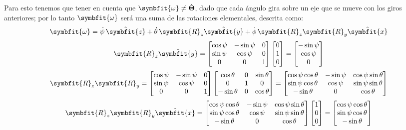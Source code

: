 \documentclass[11pt,a4paper]{article}
\numberwithin{equation}{section}
\newcommand{\vect}[1]{\symbfit{#1}}
\begin{document}
Para esto tenemos que tener en cuenta que $\vect\omega \neq \dot{\boldsymbol\Theta}$, dado que cada ángulo gira sobre un eje que se mueve con los giros anteriores; por lo tanto $\vect\omega$ será una suma de las rotaciones elementales, descrita como:
\[
\vect\omega = \dot\psi\,\hat{\vect z} + \dot\theta\,\vect R_z\hat{\vect y} + \dot\phi\,\vect R_z\vect R_y\hat{\vect x}
\]
\[
\vect R_z\hat{\vect y} = \begin{bmatrix}\cos\psi & -\sin\psi & 0\\ \sin\psi & \cos\psi & 0\\ 0 & 0 & 1\end{bmatrix}\begin{bmatrix}0\\1\\0\end{bmatrix} = \begin{bmatrix}-\sin\psi\\ \cos\psi\\ 0\end{bmatrix}
\]
{\small\[
\vect R_z\vect R_y = \begin{bmatrix}\cos\psi & -\sin\psi & 0\\ \sin\psi & \cos\psi & 0\\ 0 & 0 & 1\end{bmatrix}\begin{bmatrix}\cos\theta & 0 & \sin\theta\\ 0 & 1 & 0\\ -\sin\theta & 0 & \cos\theta\end{bmatrix}
= \begin{bmatrix}\cos\psi\cos\theta & -\sin\psi & \cos\psi\sin\theta\\ \sin\psi\cos\theta & \cos\psi & \sin\psi\sin\theta\\ -\sin\theta & 0 & \cos\theta\end{bmatrix}
\]}
{\small\[
\vect R_z\vect R_y\hat{\vect x} = \begin{bmatrix}\cos\psi\cos\theta & -\sin\psi & \cos\psi\sin\theta\\ \sin\psi\cos\theta & \cos\psi & \sin\psi\sin\theta\\ -\sin\theta & 0 & \cos\theta\end{bmatrix}\begin{bmatrix}1\\0\\0\end{bmatrix} = \begin{bmatrix}\cos\psi\cos\theta\\ \sin\psi\cos\theta\\ -\sin\theta\end{bmatrix}
\]}
\end{document}

